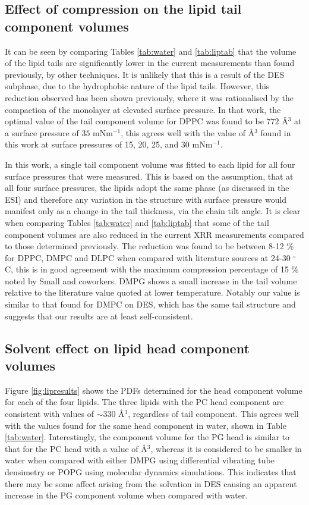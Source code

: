 \documentclass[twoside,twocolumn,9pt]{article}
\begin{document}
\subsection{Effect of compression on the lipid tail component volumes}
It can be seen by comparing Tables \ref{tab:water} and \ref{tab:liptab} that the volume of the lipid tails are significantly lower in the current measurements than found previously, by other techniques. It is unlikely that this is a result of the DES subphase, due to the hydrophobic nature of the lipid tails. However, this reduction observed has been shown previously,\cite{Campbell2018} where it was rationalised by the compaction of the monolayer at elevated surface pressure. In that work, the optimal value of the tail component volume for DPPC was found to be $772$ \AA${^3}$ at a surface pressure of $35$ mNm$^{-1}$, this agrees well with the value of  \AA$^3$ found in this work at surface pressures of 15, 20, 25, and 30 mNm$^{-1}$.

In this work, a single tail component volume was fitted to each lipid for all four surface pressures that were measured. This is based on the assumption, that at all four surface pressures, the lipids adopt the same phase (as discussed in the ESI) and therefore any variation in the structure with surface pressure would manifest only as a change in the tail thickness, via the chain tilt angle. It is clear when comparing Tables \ref{tab:water} and \ref{tab:liptab} that some of the tail component volumes are also reduced in the current XRR measurements compared to those determined previously. The reduction was found to be between 8-12 \% for DPPC, DMPC and DLPC when compared with literature sources at 24-30 $^\circ$C, this is in good agreement with the maximum compression percentage of 15 \% noted by Small and coworkers.\cite{Small1984} DMPG shows a small increase in the tail volume relative to the literature value quoted at lower temperature. Notably our value is similar to that found for DMPC on DES, which has the same tail structure and suggests that our results are at least self-consistent.

\subsection{Solvent effect on lipid head component volumes}
Figure \ref{fig:lipresults} shows the PDFs determined for the head component volume for each of the four lipids. The three lipids with the PC head component are consistent with values of $\sim330$ \AA$^3$, regardless of tail component. This agrees well with the values found for the same head component in water, shown in Table \ref{tab:water}. Interestingly, the component volume for the PG head is similar to that for the PC head with a value of \AA$^3$, whereas it is considered to be smaller in water when compared with either DMPG using differential vibrating tube densimetry\cite{Pan2012} or POPG using molecular dynamics simulations.\cite{Kucerka2012} This indicates that there may be some affect arising from the solvation in DES causing an apparent increase in the PG component volume when compared with water.
\end{document}
